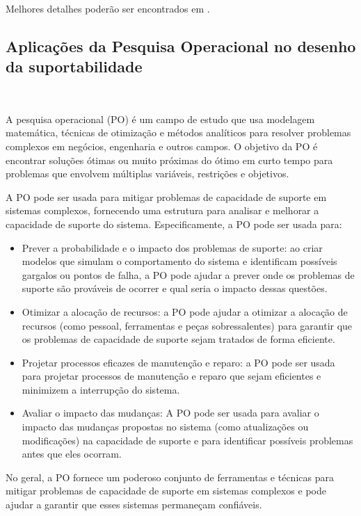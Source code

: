 \documentclass{abntex2}
\begin{document}
\begin{sloppypar}
Melhores detalhes poderão ser encontrados em \cite{MarquesAbrahaoGuilherme:2020}.



\subsection{Aplicações da Pesquisa Operacional no desenho da suportabilidade}\

A pesquisa operacional (PO) é um campo de estudo que usa modelagem matemática, técnicas de otimização e métodos analíticos para resolver problemas complexos em negócios, engenharia e outros campos. O objetivo da PO é encontrar soluções ótimas ou muito próximas do ótimo em curto tempo para problemas que envolvem múltiplas variáveis, restrições e objetivos.

A PO pode ser usada para mitigar problemas de capacidade de suporte em sistemas complexos, fornecendo uma estrutura para analisar e melhorar a capacidade de suporte do sistema. Especificamente, a PO pode ser usada para:

\begin{itemize}
	
\item Prever a probabilidade e o impacto dos problemas de suporte: ao criar modelos que simulam o comportamento do sistema e identificam possíveis gargalos ou pontos de falha, a PO pode ajudar a prever onde os problemas de suporte são prováveis de ocorrer e qual seria o impacto dessas questões.

\item Otimizar a alocação de recursos: a PO pode ajudar a otimizar a alocação de recursos (como pessoal, ferramentas e peças sobressalentes) para garantir que os problemas de capacidade de suporte sejam tratados de forma eficiente.

\item Projetar processos eficazes de manutenção e reparo: a PO pode ser usada para projetar processos de manutenção e reparo que sejam eficientes e minimizem a interrupção do sistema.

\item Avaliar o impacto das mudanças: A PO pode ser usada para avaliar o impacto das mudanças propostas no sistema (como atualizações ou modificações) na capacidade de suporte e para identificar possíveis problemas antes que eles ocorram.

\end{itemize}

No geral, a PO fornece um poderoso conjunto de ferramentas e técnicas para mitigar problemas de capacidade de suporte em sistemas complexos e pode ajudar a garantir que esses sistemas permaneçam confiáveis.



\end{sloppypar}
\end{document}
